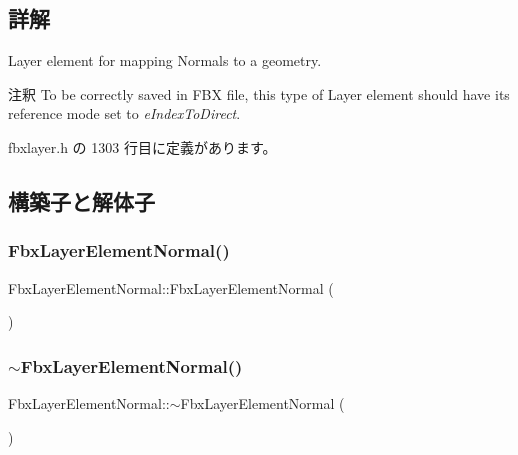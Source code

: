 \subsection{詳解}
Layer element for mapping Normals to a geometry. 

\begin{DoxyRemark}{注釈}
To be correctly saved in F\+BX file, this type of Layer element should have its reference mode set to {\itshape e\+Index\+To\+Direct}. 
\end{DoxyRemark}


 fbxlayer.\+h の 1303 行目に定義があります。



\subsection{構築子と解体子}
\mbox{\label{class_fbx_layer_element_normal_a08287396add8d7dc98695be459a7697b}} 
\subsubsection{\texorpdfstring{Fbx\+Layer\+Element\+Normal()}{FbxLayerElementNormal()}}
{\footnotesize\ttfamily Fbx\+Layer\+Element\+Normal\+::\+Fbx\+Layer\+Element\+Normal (\begin{DoxyParamCaption}{ }\end{DoxyParamCaption})\hspace{0.3cm}{\ttfamily [protected]}}

\mbox{\label{class_fbx_layer_element_normal_abd0cbe65ec982e7486de222a99a8089d}} 
\subsubsection{\texorpdfstring{$\sim$\+Fbx\+Layer\+Element\+Normal()}{~FbxLayerElementNormal()}}
{\footnotesize\ttfamily Fbx\+Layer\+Element\+Normal\+::$\sim$\+Fbx\+Layer\+Element\+Normal (\begin{DoxyParamCaption}{ }\end{DoxyParamCaption})\hspace{0.3cm}{\ttfamily [protected]}}



